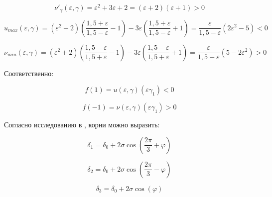 \begin{equation}
	\label{eq:equation51}
	{\nu}'_\gamma
	(\varepsilon, \gamma) = \varepsilon^2 + 3\varepsilon + 2 = (\varepsilon + 2)(\varepsilon + 1) >0
\end{equation}


\begin{equation}
	\label{eq:equation52}
	u _{max}(\varepsilon, \gamma) =
	\left( {\varepsilon^2+2} \right) 
	\left( {\frac{1,5+\varepsilon}{1,5-\varepsilon}-1} \right) - 3 \varepsilon 
	\left( {\frac{1,5+\varepsilon}{1,5-\varepsilon}+1} \right) = \frac{\varepsilon}{1,5-\varepsilon}(2\varepsilon^2 - 5) < 0
\end{equation}

\begin{equation}
	\label{eq:equation53}
	\nu _{min}(\varepsilon, \gamma) =
	\left( {\varepsilon^2+2} \right) 
	\left( {\frac{1,5-\varepsilon}{1,5+\varepsilon}-1} \right) - 3 \varepsilon 
	\left( {\frac{1,5-\varepsilon}{1,5+\varepsilon}+1} \right) = \frac{\varepsilon}{1,5-\varepsilon}(5-2\varepsilon^2) > 0
\end{equation}

Соответственно:

\begin{equation}
	\label{eq:equation54}
	f(1) = u(\varepsilon, \gamma)(\varepsilon \gamma_1) <0
\end{equation}

\begin{equation}
	\label{eq:equation55}
	f(-1) = \nu(\varepsilon, \gamma)(\varepsilon \gamma_1) > 0
\end{equation}

Согласно исследованию в \cite{nickalls1993new}, корни можно выразить:


\begin{equation}
	\label{eq:equation56}
	\delta_1 = 
	\delta_0 + 2 \sigma \cos \left({\frac{2 \pi}{3}} + \varphi  \right) 
\end{equation}

\begin{equation}
	\label{eq:equation57}
	\delta_2 = 
	\delta_0 + 2 \sigma \cos \left({\frac{2 \pi}{3}} - \varphi  \right) 
\end{equation}

\begin{equation}
	\label{eq:equation58}
	\delta_3 = 
	\delta_0 + 2 \sigma \cos (\varphi) 
\end{equation}

